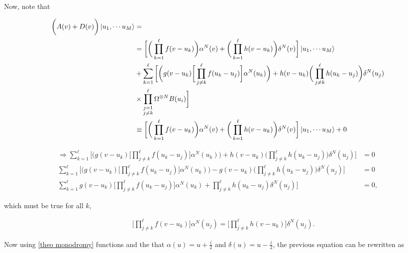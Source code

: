 \documentclass{homework}
\begin{document}
Now, note that 

\begin{align*}
        \bigg(A(v) + D(v) \bigg)\ket{u_1, \cdots u_M} &= \\
        &= \bigg[\bigg(\prod_{k=1}^{\ell} f(v-u_k)\bigg)\alpha^N(v) + \bigg(\prod_{k=1}^{\ell} h(v-u_k)\bigg) \delta^N(v) \bigg] \ket{u_1, \cdots u_M} \\
        &+ \sum_{k=1}^{\ell} \bigg[\bigg(g(v-u_k) \bigg[ \prod_{j \neq k}^{\ell} f(u_k - u_j)\bigg] \alpha^N(u_k)\bigg) + h(v-u_k) \bigg(\prod_{j \neq k}^{\ell} h(u_k - u_j)\bigg) \delta^N(u_j) \\
        &\times \prod_{\substack{j = 1 \\
                                 j \neq k}}^{\ell} \Omega^{\otimes N} B(u_i)\bigg]\\
    &\equiv \bigg[\bigg(\prod_{k=1}^{\ell} f(v-u_k)\bigg)\alpha^N(v) + \bigg(\prod_{k=1}^{\ell} h(v-u_k)\bigg) \delta^N(v) \bigg] \ket{u_1, \cdots u_M} + 0
\end{align*}

\begin{align*}
    \Rightarrow \sum_{k=1}^{\ell} \bigg[\bigg(g(v-u_k) \bigg[ \prod_{j \neq k}^{\ell} f(u_k - u_j)\bigg] \alpha^N(u_k)\bigg) + h(v-u_k) \bigg(\prod_{j \neq k}^{\ell} h(u_k - u_j)\bigg)  \delta^N(u_j) \bigg] &= 0 \\
    \sum_{k=1}^{\ell} \bigg[\bigg(g(v-u_k) \bigg[ \prod_{j \neq k}^{\ell} f(u_k - u_j)\bigg] \alpha^N(u_k)\bigg) - g(v-u_k) \bigg(\prod_{j \neq k}^{\ell} h(u_k - u_j)\bigg)  \delta^N(u_j) \bigg] &= 0 \\
    \sum_{k=1}^{\ell} g(v-u_k) \bigg[ \prod_{j \neq k}^{\ell} f(u_k - u_j)\bigg] \alpha^N(u_k) + \prod_{j \neq k}^{\ell} h(u_k - u_j) \delta^N(u_j) \bigg] &= 0,
\end{align*}

which must be true for all $k$,

\begin{align}
    & & \bigg[\prod_{j \neq k}^{\ell} f(v- u_k)\bigg] \alpha^N(u_j) = \bigg[\prod_{j \neq k}^{\ell} h(v - u_k) \bigg]  \delta^N(u_j).
\end{align}

Now using \cref{theo monodromy} functions and the that $\alpha(u) = u + \frac{i}{2}$ and $\delta(u) = u - \frac{i}{2}$, the previous equation can be rewritten as 
\end{document}
